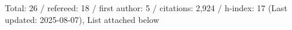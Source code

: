 Total: 26 / refereed: 18 / first author: 5 / citations: 2,924 / h-index: 17 (Last updated: 2025-08-07), List attached below